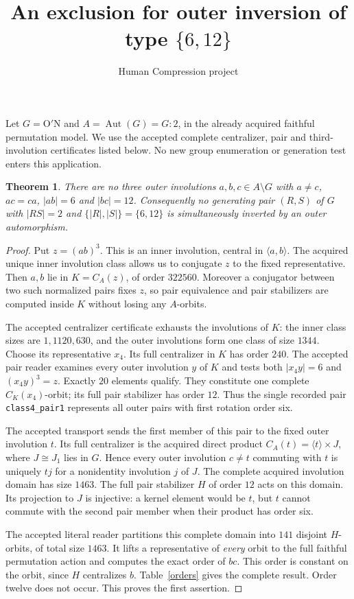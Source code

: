 \documentclass[11pt,a4paper]{article}
\title{An exclusion for outer inversion of type $\{6,12\}$}
\author{Human Compression project}\date{}
\newtheorem{theorem}{Theorem}
\newcommand{\Aut}{\operatorname{Aut}}
\newcommand{\ON}{\mathrm{O'N}}
\begin{document}
\maketitle
Let $G=\ON$ and $A=\Aut(G)=G:2$, in the already acquired faithful
permutation model. We use the accepted complete centralizer, pair and
third-involution certificates listed below. No new group enumeration or
generation test enters this application.

\begin{theorem}
There are no three outer involutions $a,b,c\in A\setminus G$ with
$a\ne c$, $ac=ca$, $|ab|=6$ and $|bc|=12$.
Consequently no generating pair $(R,S)$ of $G$ with $|RS|=2$ and
$\{|R|,|S|\}=\{6,12\}$ is simultaneously inverted by an outer
automorphism.
\end{theorem}
\begin{proof}
Put $z=(ab)^3$. This is an inner involution, central in
$\langle a,b\rangle$. The acquired unique inner involution class allows
us to conjugate $z$ to the fixed representative. Then $a,b$ lie in
$K=C_A(z)$, of order $322560$. Moreover a conjugator between two such
normalized pairs fixes $z$, so pair equivalence and pair stabilizers are
computed inside $K$ without losing any $A$-orbits.

The accepted centralizer certificate exhausts the involutions of $K$:
the inner class sizes are $1,1120,630$, and the outer involutions form
one class of size $1344$. Choose its representative $x_4$.
Its full centralizer in $K$ has order $240$. The accepted pair reader
examines every outer involution $y$ of $K$ and tests both $|x_4y|=6$
and $(x_4y)^3=z$. Exactly $20$ elements qualify. They constitute one
complete $C_K(x_4)$-orbit; its full pair stabilizer has order $12$.
Thus the single recorded pair \texttt{class4\_pair1} represents all
outer pairs with first rotation order six.

The accepted transport sends the first member of this pair to the
fixed outer involution $t$. Its full centralizer is the acquired direct
product $C_A(t)=\langle t\rangle\times J$, where $J\cong J_1$ lies
in $G$. Hence every outer involution $c\ne t$ commuting with $t$ is
uniquely $tj$ for a nonidentity involution $j$ of $J$. The complete
acquired involution domain has size $1463$. The full pair stabilizer
$H$ of order $12$ acts on this domain. Its projection to $J$ is
injective: a kernel element would be $t$, but $t$ cannot commute with
the second pair member when their product has order six.

The accepted literal reader partitions this complete domain into
$141$ disjoint $H$-orbits, of total size $1463$. It lifts a representative
of \emph{every} orbit to the full faithful permutation action and computes
the exact order of $bc$. This order is constant on the orbit, since
$H$ centralizes $b$. Table~\ref{orders} gives the complete result.
Order twelve does not occur. This proves the first assertion.


\end{proof}
\end{document}
